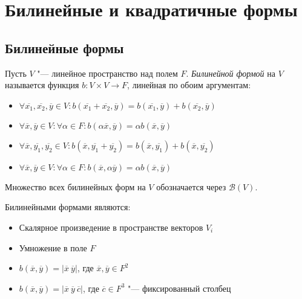 \section{Билинейные и квадратичные формы}

\subsection{Билинейные формы}

\begin{definition}
	Пусть $V$ "--- линейное пространство над полем $F$. \textit{Билинейной формой} на $V$ называется функция $b: V \times V \rightarrow F$, линейная по обоим аргументам:
	\begin{itemize}
		\item $\forall \overline{x_1}, \overline{x_2}, \overline{y} \in V: b(\overline{x_1} + \overline{x_2}, \overline{y}) = b(\overline{x_1}, \overline{y}) + b(\overline{x_2}, \overline{y})$
		\item $\forall \overline{x}, \overline{y} \in V: \forall \alpha \in F: b(\alpha\overline{x}, \overline{y}) = \alpha b(\overline{x}, \overline{y})$
		\item $\forall \overline{x}, \overline{y_1}, \overline{y_2} \in V: b(\overline{x}, \overline{y_1} + \overline{y_2}) = b(\overline{x}, \overline{y_1}) + b(\overline{x}, \overline{y_2})$
		\item $\forall \overline{x}, \overline{y} \in V: \forall \alpha \in F: b(\overline{x}, \alpha\overline{y}) = \alpha b(\overline{x}, \overline{y})$
	\end{itemize}
	
	Множество всех билинейных форм на $V$ обозначается через $\mathcal{B}(V)$.
\end{definition}

\begin{example}
	Билинейными формами являются:
	\begin{itemize}
		\item Скалярное произведение в пространстве векторов $V_i$
		\item Умножение в поле $F$
		\item $b(\overline{x}, \overline{y}) = |\overline{x}~\overline{y}|$, где	$\overline x, \overline y \in F^2$
		\item $b(\overline{x}, \overline{y}) = |\overline{x}~\overline{y}~\overline{c}|$, где $\overline{c} \in F^3$ "--- фиксированный столбец
	\end{itemize}
\end{example} 

